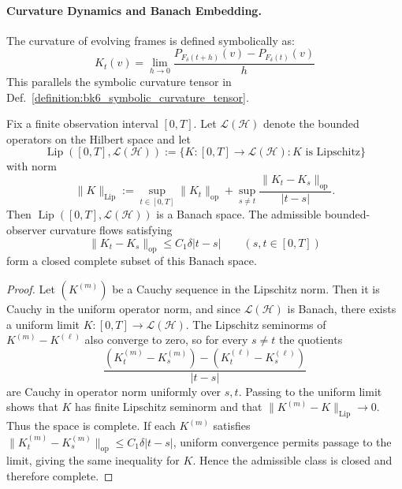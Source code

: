 \paragraph{Curvature Dynamics and Banach Embedding.}
\label{paragraph:appC_curvature_dynamics_and_banach_embedding}

\begin{definition}
\label{definition:appC_frame_curvature_operator}
The curvature of evolving frames is defined symbolically as:
\[
K_t(v) = \lim_{h \to 0} \frac{P_{F_\delta(t+h)}(v) - P_{F_\delta(t)}(v)}{h}
\]
This parallels the symbolic curvature tensor in Def.~\ref{definition:bk6_symbolic_curvature_tensor}.
\end{definition}

\begin{lemma}
\label{lemma:appC_banach_space_of_curvature_flows}
Fix a finite observation interval $[0,T]$. Let
$\mathcal{L}(\mathcal{H})$ denote the bounded operators on the Hilbert space and
let
\[
\operatorname{Lip}([0,T],\mathcal{L}(\mathcal{H}))
:=\{K:[0,T]\to\mathcal{L}(\mathcal{H}) : K\text{ is Lipschitz}\}
\]
with norm
\[
\|K\|_{\operatorname{Lip}}
:=\sup_{t\in[0,T]}\|K_t\|_{\mathrm{op}}
+\sup_{s\ne t}\frac{\|K_t-K_s\|_{\mathrm{op}}}{|t-s|}.
\]
Then $\operatorname{Lip}([0,T],\mathcal{L}(\mathcal{H}))$ is a Banach space. The
admissible bounded-observer curvature flows satisfying
\[
\|K_t-K_s\|_{\mathrm{op}}\le C_1\delta |t-s|\qquad(s,t\in[0,T])
\]
form a closed complete subset of this Banach space.
\end{lemma}

\begin{proof}
\label{proof:appC_banach_space_of_curvature_flows}
Let $(K^{(m)})$ be a Cauchy sequence in the Lipschitz norm. Then it is Cauchy in
the uniform operator norm, and since $\mathcal{L}(\mathcal{H})$ is Banach, there
exists a uniform limit $K:[0,T]\to\mathcal{L}(\mathcal{H})$. The Lipschitz
seminorms of $K^{(m)}-K^{(\ell)}$ also converge to zero, so for every $s\ne t$
the quotients
\[
\frac{(K^{(m)}_t-K^{(m)}_s)-(K^{(\ell)}_t-K^{(\ell)}_s)}{|t-s|}
\]
are Cauchy in operator norm uniformly over $s,t$. Passing to the uniform limit
shows that $K$ has finite Lipschitz seminorm and that
$\|K^{(m)}-K\|_{\operatorname{Lip}}\to0$. Thus the space is complete.
If each $K^{(m)}$ satisfies
$\|K^{(m)}_t-K^{(m)}_s\|_{\mathrm{op}}\le C_1\delta |t-s|$, uniform convergence
permits passage to the limit, giving the same inequality for $K$. Hence the
admissible class is closed and therefore complete.
\end{proof}

